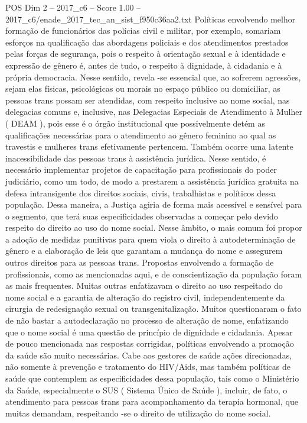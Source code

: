 \begin{textsample}{POS Dim 2 – 2017\_c6 – Score 1.00 – 2017\_c6/enade\_2017\_tec\_an\_sist\_f950c36aa2.txt}
Políticas envolvendo melhor formação de funcionários das polícias civil e militar, por exemplo, somariam esforços na qualificação das abordagens policiais e dos atendimentos prestados pelas forças de segurança, pois o respeito à orientação sexual e à identidade e expressão de gênero é, antes de tudo, o respeito à dignidade, à cidadania e à própria democracia.
Nesse sentido, revela -se essencial que, ao sofrerem agressões, sejam elas físicas, psicológicas ou morais no espaço público ou domiciliar, as pessoas trans possam ser atendidas, com respeito inclusive ao nome social, nas delegacias comuns e, inclusive, nas Delegacias Especiais de Atendimento à Mulher ( DEAM ), pois esse é o órgão institucional que possivelmente detém as qualificações necessárias para o atendimento ao gênero feminino ao qual as travestis e mulheres trans efetivamente pertencem.
Também ocorre uma latente inacessibilidade das pessoas trans à assistência jurídica.
Nesse sentido, é necessário implementar projetos de capacitação para profissionais do poder judiciário, como um todo, de modo a prestarem a assistência jurídica gratuita na defesa intransigente dos direitos sociais, civis, trabalhistas e políticos dessa população.
Dessa maneira, a Justiça agiria de forma mais acessível e sensível para o segmento, que terá suas especificidades observadas a começar pelo devido respeito do direito ao uso do nome social.
Nesse âmbito, o mais comum foi propor a adoção de medidas punitivas para quem viola o direito à autodeterminação de gênero e a elaboração de leis que garantam a mudança do nome e assegurem outros direitos para as pessoas trans.
Propostas envolvendo a formação de profissionais, como as mencionadas aqui, e de conscientização da população foram as mais frequentes.
Muitas outras enfatizavam o direito ao uso respeitado do nome social e a garantia de alteração do registro civil, independentemente da cirurgia de redesignação sexual ou transgenitalização.
Muitos questionaram o fato de não bastar a autodeclaração no processo de alteração de nome, enfatizando que o nome social é uma questão de princípio de dignidade e cidadania.
Apesar de pouco mencionada nas respostas corrigidas, políticas envolvendo a promoção da saúde são muito necessárias.
Cabe aos gestores de saúde ações direcionadas, não somente à prevenção e tratamento do HIV/Aids, mas também políticas de saúde que contemplem as especificidades dessa população, tais como o Ministério da Saúde, especialmente o SUS ( Sistema Único de Saúde ), incluir, de fato, o atendimento para pessoas trans para acompanhamento da terapia hormonal, que muitas demandam, respeitando -se o direito de utilização do nome social.

\end{textsample}
